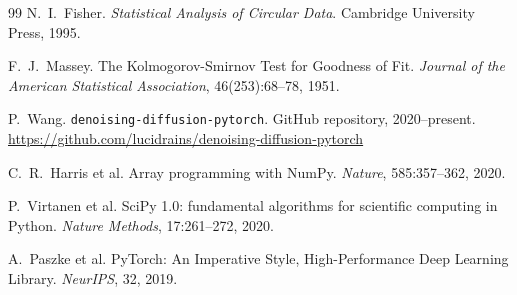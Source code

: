 \documentclass[11pt]{article}
\begin{document}
\begin{thebibliography}{99}
N.\ I.\ Fisher. \textit{Statistical Analysis of Circular Data}. Cambridge University Press, 1995.

F.\ J.\ Massey. The Kolmogorov-Smirnov Test for Goodness of Fit. \textit{Journal of the American Statistical Association}, 46(253):68--78, 1951.

P.\ Wang. \texttt{denoising-diffusion-pytorch}. GitHub repository, 2020--present. \\
\url{https://github.com/lucidrains/denoising-diffusion-pytorch}

C.\ R.\ Harris et al. Array programming with NumPy. \textit{Nature}, 585:357--362, 2020.

P.\ Virtanen et al. SciPy 1.0: fundamental algorithms for scientific computing in Python. \textit{Nature Methods}, 17:261--272, 2020.

A.\ Paszke et al. PyTorch: An Imperative Style, High-Performance Deep Learning Library. \textit{NeurIPS}, 32, 2019.

\end{thebibliography}
\end{document}
